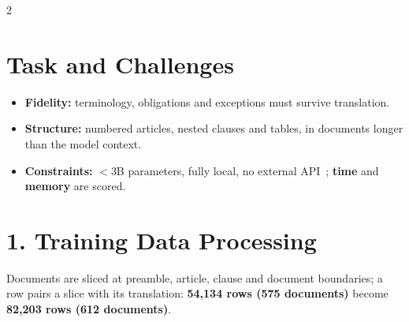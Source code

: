 \documentclass[a0,portrait]{a0poster}
\newcommand{\psec}[1]{\section*{\fontsize{46}{52}\selectfont\color{NavyBlue}#1}}  %
\begin{document}
\vspace{0.35cm}

\color{Black!88}
\begin{multicols}{2}

\psec{Task and Challenges}

\begin{itemize}
\item \textbf{Fidelity:} terminology, obligations and exceptions must survive translation.
\item \textbf{Structure:} numbered articles, nested clauses and tables, in documents longer than the model context.
\item \textbf{Constraints:} $<$3B parameters, fully local, no external API~\cite{vlsp2026}; \textbf{time} and \textbf{memory} are scored.
\end{itemize}

\psec{1. Training Data Processing}

Documents are sliced at preamble, article, clause and document boundaries; a row pairs a slice with its translation: \textbf{54,134 rows (575 documents)} become \textbf{82,203 rows (612 documents)}.


\end{multicols}
\end{document}
